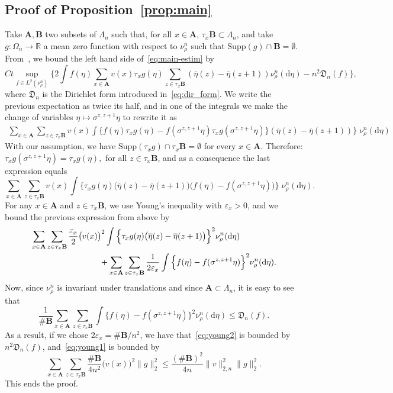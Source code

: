 \documentclass[AHL,Unicode,longabstracts]{cedram}
\newcommand{\bfA}{\mathbf{A}}
\newcommand{\bfB}{\mathbf{B}}
\newcommand{\bb}[1]{{\mathbb #1}}
\renewcommand{\bar}{\overline}
\renewcommand{\leq}{\leqslant}
\newcommand*{\dd}{\mathrm{d}}
\begin{document}
\subsection{Proof of Proposition~\ref{prop:main}}\label{ssec:proof}
Take $\bfA, \bfB$ two subsets of $\Lambda_n$ such that, for all $x\in\bfA$, $\tau_x{\bfB} \subset \Lambda_n$, and take $g:\Omega_n\to\bb R$ a mean zero function with respect to $\nu^n_\rho$ such that $\mathrm{Supp}(g)\cap {\bfB} = \emptyset$. From~\cite[Lemma~2.4]{KLO}, we bound the left hand side of~\eqref{eq:main-estim} by
\begin{equation*}
Ct\sup_{f\in L^2(\nu^n_\rho)} \bigg\{ 2 \int f(\eta) \sum_{x\in\bfA} v(x) \tau_x g(\eta) \sum_{z \in \tau_x \bfB} (\bar\eta(z)-\bar\eta(z+1)) \nu^n_\rho(\dd\eta) - n^2\mathfrak D_n(f)\bigg\},\label{eq:vari}
\end{equation*}
where $\mathfrak D_n$ is the Dirichlet form introduced in~\eqref{eq:dir_form}. We write the previous expectation as twice its half, and in one of the integrals we make the change of variables $\eta \mapsto \sigma^{z,z+1}\eta$ to rewrite it as
\begin{align*}\label{eq:sumint}
\sum_{x\in\bfA} \sum_{z\in\tau_x \bfB}v(x) \int \Big\{f(\eta) \tau_xg(\eta)- f(\sigma^{z,z+1}\eta) \tau_xg(\sigma^{z,z+1}\eta)\Big\} (\bar\eta(z)-\bar\eta(z+1)) \Big\}\; \nu^n_\rho(\dd\eta)
\end{align*}
With our assumption, we have $\mathrm{Supp}(\tau_xg) \cap \tau_x {\bfB} = \emptyset$ for every $x \in \bfA$. Therefore: $ \tau_xg(\sigma^{z,z+1}\eta)=\tau_x g(\eta),$ for all $z\in\tau_x{\bfB}$, and as a consequence the last expression equals
\begin{equation*}
\sum_{x\in\bfA} \sum_{z \in \tau_x \bfB}v(x) \int \Big\{ \tau_x g(\eta) \big(\bar\eta(z)-\bar\eta(z+1)\big) \big(f(\eta)-f(\sigma^{z,z+1}\eta)\big) \Big\}\; \nu^n_\rho(\dd\eta).
\end{equation*}
For any $x\in\bfA$ and $z\in\tau_x\bfB$, we use Young's inequality with $\varepsilon_x >0$, and we bound the previous expression from above by
\begin{align}
& \sum_{x\in\bfA} \sum_{z\in\tau_x\bfB}\frac{\varepsilon_x}{2} \big(v(x)\big)^2 \int \Big\{\tau_x g(\eta)\big(\bar\eta(z)-\bar\eta(z+1)\big)\Big\}^2 \nu^n_\rho(\dd\eta) \label{eq:young1}
\\
&\mkern 150mu+ \sum_{x\in\bfA}\sum_{z\in\tau_x\bfB} \frac{1}{2\varepsilon_x} \int \Big\{f(\eta)-f(\sigma^{z,z+1}\eta)\Big\}^2 \nu^n_\rho(\dd\eta). \label{eq:young2}
\end{align}
Now, since $\nu^n_\rho$ is invariant under translations and since ${\bfA}\subset \Lambda_n$, it is easy to see that
\[
\frac{1}{\#\bfB}\sum_{x\in\bfA}\sum_{z\in\tau_x\bfB} \int \Big\{f(\eta)-f(\sigma^{z,z+1}\eta)\Big\}^2 \nu^n_\rho(\dd\eta) \leq \mathfrak D_n(f).
\]
As a result, if we chose $2\varepsilon_x = \#{\bfB}/ n^2$, we have that~\eqref{eq:young2} is bounded by $n^2 \mathfrak D_n(f)$, and~\eqref{eq:young1} is bounded by
\[
\sum_{x\in\bfA} \sum_{z\in\tau_x\bfB} \frac{\#\bfB}{4n^2}\big(v(x)\big)^2 \|g\|_2^2 \leq \frac{(\#{\bfB})^2}{4n} \|v\|_{2,n}^2 \|g\|_2^2.
\]
This ends the proof.
\end{document}
